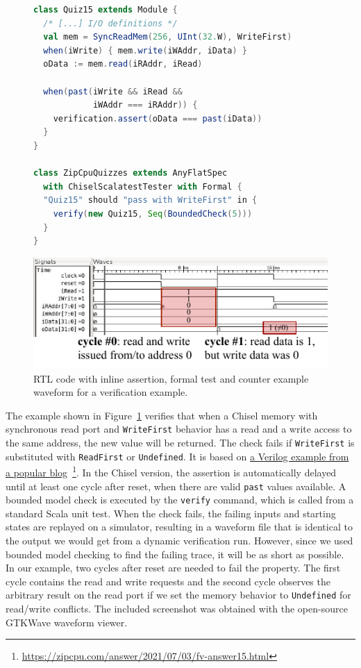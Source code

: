 \documentclass[conference]{IEEEtran}
\newcommand{\code}[1]{{\small{\texttt{#1}}}}
\begin{document}
\begin{figure}
    \centering
\begin{lstlisting}[language=scala]
class Quiz15 extends Module {
  /* [...] I/O definitions */
  val mem = SyncReadMem(256, UInt(32.W), WriteFirst)
  when(iWrite) { mem.write(iWAddr, iData) }
  oData := mem.read(iRAddr, iRead)

  when(past(iWrite && iRead &&
            iWAddr === iRAddr)) {
    verification.assert(oData === past(iData))
  }
}

class ZipCpuQuizzes extends AnyFlatSpec
  with ChiselScalatestTester with Formal {
  "Quiz15" should "pass with WriteFirst" in {
    verify(new Quiz15, Seq(BoundedCheck(5)))
  }
}
\end{lstlisting}

\includegraphics{woset_2021_quiz15.pdf}
\caption[]{RTL code with inline assertion, formal test and counter example waveform for a verification example.}
\label{fig:quiz15}
\end{figure}

The example shown in Figure~\ref{fig:quiz15} verifies that when a Chisel memory with synchronous read port and
\code{WriteFirst} behavior has a read and a write access to the same address,
the new value will be returned.
The check fails if \code{WriteFirst} is substituted with \code{ReadFirst} or \code{Undefined}.
It is based on \href{https://zipcpu.com/answer/2021/07/03/fv-answer15.html}{a Verilog example from a popular blog}~\footnote{\url{https://zipcpu.com/answer/2021/07/03/fv-answer15.html}}.
In the Chisel version, the assertion is automatically delayed until at least one cycle after reset, when there are valid \code{past} values available.
A bounded model check is executed by the \code{verify} command, which is called from a standard Scala unit test.
When the check fails, the failing inputs and starting states are replayed on a simulator, resulting in a waveform file that is identical
to the output we would get from a dynamic verification run.
However, since we used bounded model checking to find the failing trace, it will be as short as possible.
In our example, two cycles after reset are needed to fail the property.
The first cycle contains the read and write requests and the second cycle observes the arbitrary result on the read port if
we set the memory behavior to \code{Undefined} for read/write conflicts.
The included screenshot was obtained with the open-source GTKWave waveform viewer.
\end{document}
